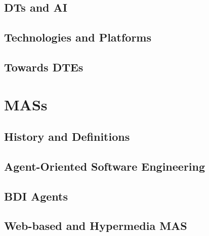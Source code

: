 \documentclass[12pt,a4paper,openright,twoside]{book}
\begin{document}
\section{\aclp{DT} and \acl{AI}}

\section{Technologies and Platforms}

\section{Towards \aclp{DTE}}


\chapter{\aclp{MAS}}
\label{chap:back:MAS}

\section{History and Definitions}

\section{Agent-Oriented Software Engineering}

\section{\acl{BDI} Agents}

\section{Web-based and Hypermedia \ac{MAS}}
\end{document}
